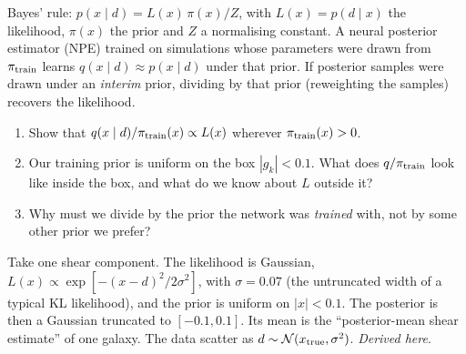 
\begin{given}
Bayes' rule: $p(x \mid d) = L(x)\,\pi(x) / Z$, with $L(x) = p(d\mid x)$ the likelihood, $\pi(x)$ the prior and $Z$
a normalising constant. A neural posterior estimator (NPE) trained on simulations whose parameters were drawn from
$\pi_{\rm train}$ learns $q(x\mid d) \approx p(x\mid d)$ under that prior. If posterior samples were drawn under an
\emph{interim} prior, dividing by that prior (reweighting the samples) recovers the likelihood.
\end{given}


\begin{enumerate}
  \item Show that $q(x\mid d)/\pi_{\rm train}(x) \propto L(x)$ wherever $\pi_{\rm train}(x) > 0$.
  \item Our training prior is uniform on the box $|g_k| < 0.1$. What does $q/\pi_{\rm train}$ look like inside the box, and
    what do we know about $L$ outside it?
  \item Why must we divide by the prior the network was \emph{trained} with, not by some other prior we prefer?
\end{enumerate}



\begin{given}
Take one shear component. The likelihood is Gaussian, $L(x) \propto \exp[-(x-d)^2/2\sigma^2]$, with $\sigma = 0.07$
(the untruncated width of a typical KL likelihood), and the prior is uniform on $|x| < 0.1$. The posterior is then a
Gaussian truncated to $[-0.1, 0.1]$. Its mean is the ``posterior-mean shear estimate'' of one galaxy. The data scatter
as $d \sim \mathcal N(x_{\rm true}, \sigma^2)$. \emph{Derived here}.
\end{given}

